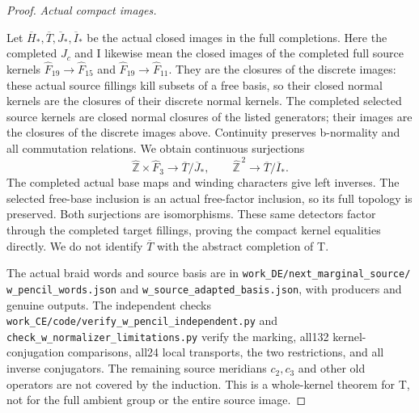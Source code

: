 \begin{proof}
\emph{Actual compact images.}\par
Let \(\overline H_*,\overline T,\overline J_*,\overline I_*\)
be the actual closed images in the full completions.
Here the completed \(J_c\) and I likewise mean the closed images
of the completed full source kernels \( \widehat F_{19}\to
\widehat F_{15}\) and \(\widehat F_{19}\to\widehat F_{11}\).
They are the closures of the discrete images: these actual
source fillings kill subsets of a free basis, so their closed
normal kernels are the closures of their discrete normal kernels.
The completed selected source kernels are closed normal
closures of the listed generators; their images are the
closures of the discrete images above. Continuity preserves
b-normality and all commutation relations. We obtain
continuous surjections
\[
 \widehat{\mathbb Z}\times\widehat F_3
       \longrightarrow\overline T/\overline J_*,
 \qquad
 \widehat{\mathbb Z}^{\,2}
       \longrightarrow\overline T/\overline I_*.
\tag{B.83.13}
\]
The completed actual base maps and winding characters give
left inverses. The selected free-base inclusion is an actual
free-factor inclusion, so its full topology is preserved.
Both surjections are isomorphisms. These same detectors
factor through the completed target fillings, proving the
compact kernel equalities directly. We do not identify
\(\overline T\) with the abstract completion of T.

The actual braid words and source basis are in
\texttt{work\_DE/next\_marginal\_source/}\allowbreak
\texttt{w\_pencil\_words.json} and
\texttt{w\_source\_adapted\_basis.json}, with producers and
genuine outputs. The independent checks
\texttt{work\_CE/code/verify\_w\_pencil\_independent.py} and
\texttt{check\_w\_normalizer\_limitations.py} verify the marking,
all132 kernel-conjugation comparisons, all24 local transports,
the two restrictions, and all inverse conjugators.
The remaining source meridians \(c_2,c_3\) and other old
operators are not covered by the induction. This is a
whole-kernel theorem for T, not for the full ambient group
or the entire source image.
\end{proof}

